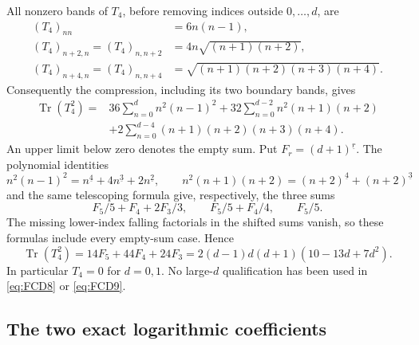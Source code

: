 \documentclass[11pt]{article}
\begin{document}
All nonzero bands of \(T_4\), before removing indices outside \(0,\ldots,d\),
are
\[
 \begin{split}
 (T_4)_{nn}&=6n(n-1),\\
 (T_4)_{n+2,n}=(T_4)_{n,n+2}
       &=4n\sqrt{(n+1)(n+2)},\\
 (T_4)_{n+4,n}=(T_4)_{n,n+4}
       &=\sqrt{(n+1)(n+2)(n+3)(n+4)} .
 \end{split}
\]
Consequently the compression, including its two boundary bands, gives
\[
 \begin{split}
 \operatorname{Tr}(T_4^2)
 ={}&36\sum_{n=0}^d n^2(n-1)^2
     +32\sum_{n=0}^{d-2}n^2(n+1)(n+2)\\
    &+2\sum_{n=0}^{d-4}(n+1)(n+2)(n+3)(n+4).
 \end{split}
\]
An upper limit below zero denotes the empty sum. Put
\(F_r=(d+1)^{\underline r}\). The polynomial identities
\[
 n^2(n-1)^2=n^{\underline4}+4n^{\underline3}+2n^{\underline2},
 \qquad
 n^2(n+1)(n+2)=(n+2)^{\underline4}+(n+2)^{\underline3}
\]
and the same telescoping formula give, respectively, the three sums
\[
 F_5/5+F_4+2F_3/3,\qquad F_5/5+F_4/4,\qquad F_5/5.
\]
The missing lower-index falling factorials in the shifted sums vanish, so
these formulas include every empty-sum case. Hence
\begin{equation}
 \boxed{\displaystyle
 \operatorname{Tr}(T_4^2)=14F_5+44F_4+24F_3
             =2(d-1)d(d+1)(10-13d+7d^2).}
 \tag{FCD9}\label{eq:FCD9}
\end{equation}
In particular \(T_4=0\) for \(d=0,1\). No large-\(d\) qualification
has been used in \eqref{eq:FCD8} or \eqref{eq:FCD9}.

\subsection{The two exact logarithmic coefficients}
\end{document}
